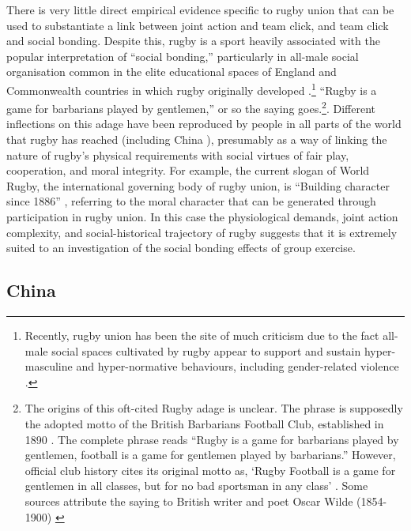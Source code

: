   There is very little direct empirical evidence specific to rugby union that can be used to substantiate a link between joint action and team click, and team click and social bonding.  Despite this, rugby is a sport heavily associated with the popular interpretation of ``social bonding,'' particularly in all-male social organisation common in the elite educational spaces of England and Commonwealth countries in which rugby originally developed \citep{Dunning2005,Richards2007,Collins2008}.\footnote{Recently, rugby union has been the site of much criticism due to the fact all-male social spaces cultivated by rugby appear to support and sustain hyper-masculine and hyper-normative behaviours, including gender-related violence \citep{Cosslett2014}.
  }   ``Rugby is a game for barbarians played by gentlemen,'' or so the saying goes.\footnote{The origins of this oft-cited Rugby adage is unclear.  The phrase is supposedly the adopted motto of the British Barbarians Football Club, established in 1890 \citep[34]{Dunning2005}.  The complete phrase reads ``Rugby is a game for barbarians played by gentlemen, football is a game for gentlemen played by barbarians.''  However, official club history cites its original motto as, ‘Rugby Football is a game for gentlemen in all classes, but for no bad sportsman in any class' \citep[vii]{Starmer-Smith1977}.  Some sources attribute the saying to British writer and poet Oscar Wilde (1854-1900) \citep{Fleenor2015}}. Different inflections on this adage have been reproduced by people in all parts of the world that rugby has reached (including China \cite{}), presumably as a way of linking the nature of rugby's physical requirements with social virtues of fair play, cooperation, and moral integrity. For example, the current slogan of World Rugby, the international governing body of rugby union, is ``Building character since 1886'' \citep{WorldRugby2017}, referring to the moral character that can be generated through participation in rugby union.  In this case the physiological demands, joint action complexity, and social-historical trajectory of rugby suggests that it is extremely suited to an investigation of the social bonding effects of group exercise.



  \subsection{China}

